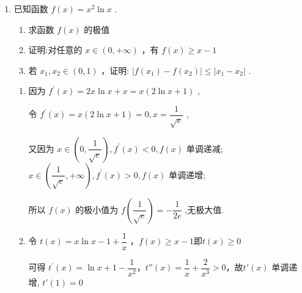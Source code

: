\begin{enumerate}
\begin{enumerate}
\begin{jieda}
\begin{enumerate}
                \item 方法2

                $\dfrac{a(x_1^2-x_2^2)}{x_1-x_2} > -3$，即$a(x_1+x_2) > -3$故$a \geq -\dfrac{3}{4}$
            \end{enumerate}
        \end{jieda}

        
        \item 已知函数 $f\left( x\right)  = {x}^{2}\ln x$ .
        \begin{enumerate}
            \item 求函数 $f\left( x\right)$ 的极值
            
            \item 证明:对任意的 $x \in  \left( {0, + \infty }\right)$ ，有 $f\left( x\right)  \geq  x - 1$
            
            \item 若 ${x}_{1},{x}_{2} \in  \left( {0,1}\right)$ ，证明: $\left| {f\left( {x}_{1}\right)  - f\left( {x}_{2}\right) }\right|  \leq  \left| {{x}_{1} - {x}_{2}}\right|$ .
        \end{enumerate}

        \begin{jieda}
            \begin{enumerate}
                \item 因为 ${f}^{\prime }\left( x\right)  = {2x}\ln x + x = x\left( {2\ln x + 1}\right)$ ,
                
                令 ${f}^{\prime }\left( x\right)  = x\left( {2\ln x + 1}\right)  = 0,x = \dfrac{1}{\sqrt{{e}}}$ ,
                
                又因为 $x \in  \left( {0,\dfrac{1}{\sqrt{{e}}}}\right) ,{f}^{\prime }\left( x\right)  < 0,f\left( x\right)$ 单调递减; $x \in  \left( {\dfrac{1}{\sqrt{{e}}}, + \infty }\right) ,{f}^{\prime }\left( x\right)  > 0,f\left( x\right)$ 单调递增;
                
                所以 $f\left( x\right)$ 的极小值为 $f\left( \dfrac{1}{\sqrt{{e}}}\right)  =  - \dfrac{1}{2{e}}$ ,无极大值.

                \item 令 $t\left( x\right)  = x\ln x - 1 + \dfrac{1}{x}$ ，$f\left( x\right)  \geq  x - 1$即$t(x) \geq 0$
                
                可得 ${t}^{\prime }\left( x\right)  = \ln x + 1 - \dfrac{1}{{x}^{2}}$，$t''\left( x\right)  = \dfrac{1}{x} + \dfrac{2}{{x}^{3}} > 0$，故$t'\left( x\right)$ 单调递增, $t'\left( 1\right)  = 0$


\end{enumerate}
\end{jieda}
\end{enumerate}
\end{enumerate}
